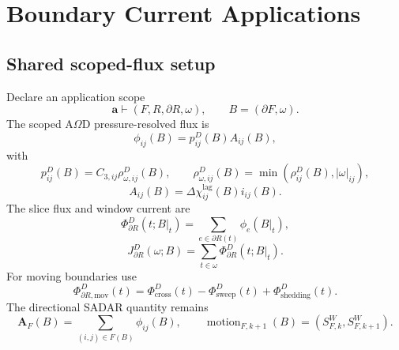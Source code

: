 \section{Boundary Current Applications}\label{manual:boundary-current-applications}

\subsection{Shared scoped-flux setup}\label{manual:boundary-current:shared-setup}
Declare an application scope
\[
\mathbf a\vdash(F,R,\partial R,\omega),
\qquad
B=(\partial F,\omega).
\]
The scoped A\(\Omega\)D pressure-resolved flux is
\[
\phi_{ij}(B)=p^D_{ij}(B)A_{ij}(B),
\]
with
\[
p^D_{ij}(B)=C_{3,ij}\rho^D_{\omega,ij}(B),
\qquad
\rho^D_{\omega,ij}(B)=\min(\rho^D_{ij}(B),|\omega|_{ij}),
\]
\[
A_{ij}(B)=\Delta\chi^{\mathrm{lag}}_{ij}(B)i_{ij}(B).
\]
The slice flux and window current are
\[
\Phi^D_{\partial R}(t;B|_t)
=
\sum_{e\in\partial R(t)}\phi_e(B|_t),
\]
\[
J^D_{\partial R}(\omega;B)
=
\sum_{t\in\omega}\Phi^D_{\partial R}(t;B|_t).
\]
For moving boundaries use
\[
\Phi^D_{\partial R,\mathrm{mov}}(t)
=
\Phi^D_{\mathrm{cross}}(t)
-
\Phi^D_{\mathrm{sweep}}(t)
+
\Phi^D_{\mathrm{shedding}}(t).
\]
The directional SADAR quantity remains
\[
\mathbf A_F(B)=\sum_{(i,j)\in F(B)}\phi_{ij}(B),
\qquad
\operatorname{motion}_{F,k+1}(B)=(S^W_{F,k},S^W_{F,k+1}).
\]

